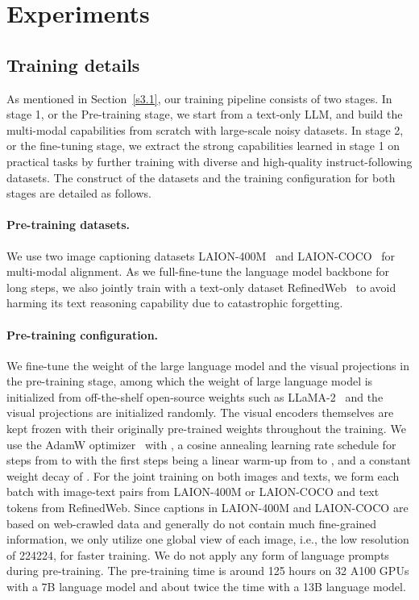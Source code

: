 \documentclass{article} \usepackage{iclr2024_conference,times}
\begin{document}
\section{Experiments}


\subsection{Training details}

As mentioned in Section~\ref{s3.1}, our training pipeline consists of two stages. In stage 1, or the Pre-training stage, we start from a text-only LLM, and build the multi-modal capabilities from scratch with large-scale noisy datasets. In stage 2, or the fine-tuning stage, we extract the strong capabilities learned in stage 1 on practical tasks by further training with diverse and high-quality instruct-following datasets. The construct of the datasets and the training configuration for both stages are detailed as follows.

\paragraph{Pre-training datasets.} We use two image captioning datasets LAION-400M~\citep{schuhmann2021laion} and LAION-COCO~\citep{laioncoco} for multi-modal alignment. As we full-fine-tune the language model backbone for long steps, we also jointly train with a text-only dataset RefinedWeb~\citep{Penedo2023TheRD} to avoid harming its text reasoning capability due to catastrophic forgetting.

\paragraph{Pre-training configuration.} We fine-tune the weight of the large language model and the visual projections in the pre-training stage, among which the weight of large language model is initialized from off-the-shelf open-source weights such as LLaMA-2~\citep{Touvron2023Llama2O} and the visual projections are initialized randomly. The visual encoders themselves are kept frozen with their originally pre-trained weights throughout the training. We use the AdamW optimizer~\citep{Kingma2014AdamAM} with , a cosine annealing learning rate schedule for  steps from  to  with the first  steps being a linear warm-up from  to , and a constant weight decay of . For the joint training on both images and texts, we form each batch with  image-text pairs from LAION-400M or LAION-COCO and  text tokens from RefinedWeb. Since captions in LAION-400M and LAION-COCO are based on web-crawled data and generally do not contain much fine-grained information, we only utilize one global view of each image, i.e., the low resolution of 224224, for faster training. We do not apply any form of language prompts during pre-training. The pre-training time is around 125 hours on 32 A100 GPUs with a 7B language model and about twice the time with a 13B language model.
\end{document}
